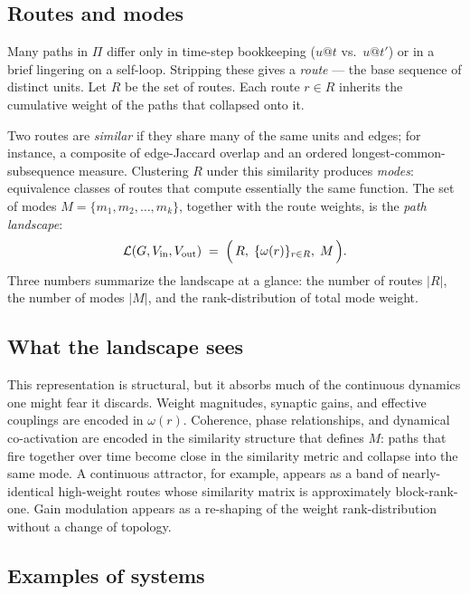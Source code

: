 \documentclass[11pt,a4paper]{article}
\begin{document}
\subsection{Routes and modes}

Many paths in $\Pi$ differ only in time-step bookkeeping
($u\!@\!t$ vs.\ $u\!@\!t'$) or in a brief lingering on a self-loop.
Stripping these gives a \emph{route} --- the base sequence of
distinct units. Let $R$ be the set of routes. Each route $r\in R$
inherits the cumulative weight of the paths that collapsed onto it.

Two routes are \emph{similar} if they share many of the same units
and edges; for instance, a composite of edge-Jaccard overlap and an
ordered longest-common-subsequence measure. Clustering $R$ under
this similarity produces \emph{modes}: equivalence classes of routes
that compute essentially the same function. The set of modes
$M = \{m_1, m_2, \dots, m_k\}$, together with the route weights, is
the \emph{path landscape}:
\[
\mathcal{L}(G,V_{\text{in}},V_{\text{out}})
\;=\;
\Bigl(\, R,\; \{\omega(r)\}_{r\in R},\; M\,\Bigr).
\]
Three numbers summarize the landscape at a glance: the number of
routes $|R|$, the number of modes $|M|$, and the rank-distribution
of total mode weight.

\subsection{What the landscape sees}

This representation is structural, but it absorbs much of the
continuous dynamics one might fear it discards. Weight magnitudes,
synaptic gains, and effective couplings are encoded in $\omega(r)$.
Coherence, phase relationships, and dynamical co-activation are
encoded in the similarity structure that defines $M$: paths that
fire together over time become close in the similarity metric and
collapse into the same mode. A continuous attractor, for example,
appears as a band of nearly-identical high-weight routes whose
similarity matrix is approximately block-rank-one. Gain modulation
appears as a re-shaping of the weight rank-distribution without a
change of topology.

\subsection{Examples of systems}
\end{document}
